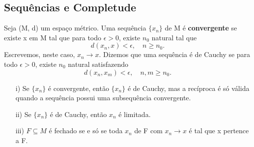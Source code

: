 \documentclass[complex.tex]{subfiles}
\begin{document}
\subsection{Sequências e Completude}
\begin{def*}
	Seja (M, d) um espaço métrico. Uma sequência $\{x _{n}\}$ de M é \textbf{convergente} se existe x em M tal que
	para todo $\epsilon > 0$, existe $n_{0}$ natural tal que
	$$
		d(x _{n}, x) < \epsilon, \quad n\geq n_{0}.
	$$
	Escrevemos, neste caso, $x _{n}\to x$. Dizemos que uma sequência é de Cauchy se para todo $\epsilon > 0$, existe
	$n_{0}$ natural satisfazendo
	$$
		d(x _{n}, x _{m}) < \epsilon, \quad n, m \geq n_{0}.
	$$
\end{def*}

\begin{exer*}
	\begin{itemize}
		\item[i)] Se $\{x _{n}\}$ é convergente, então $\{x_n\}$ é de Cauchy, mas a recíproca é só válida
		      quando a sequência possui uma subsequência convergente.
		\item[ii)] Se $\{x_{n}\}$ é de Cauchy, então $x_{n}$ é limitada.
		\item[iii)] $F\subseteq{M}$ é fechado se e só se toda $x_{n}$ de F com $x_{n}\to x$ é tal que x pertence a F.
	\end{itemize}
\end{exer*}
\end{document}
